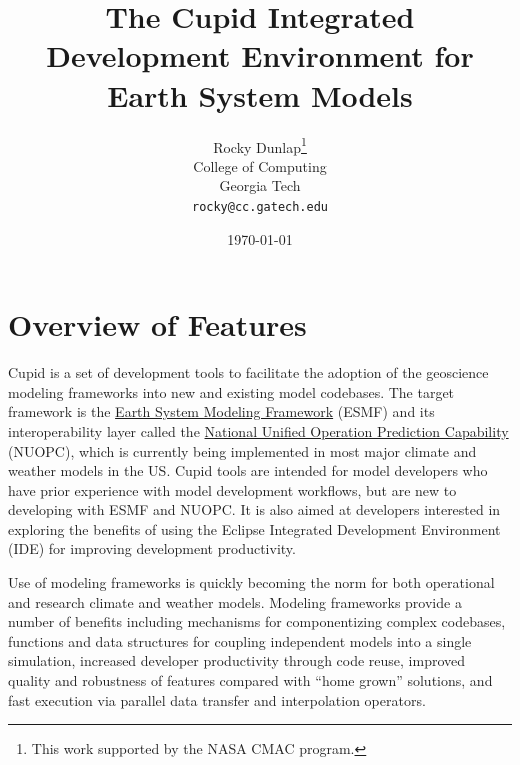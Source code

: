 \documentclass[oneside,11pt]{memoir}
\begin{document}
\title{The Cupid Integrated Development Environment for Earth System Models}
\author{Rocky Dunlap\thanks{This work supported by the NASA CMAC program.}\\
	College of Computing\\
	Georgia Tech\\
	\texttt{rocky@cc.gatech.edu}}
\date{\today}


\maketitle



\clearpage
\tableofcontents

\chapter{Overview of Features}

Cupid is a set of development tools to facilitate the adoption of the geoscience modeling frameworks into new and existing model codebases.  The target framework is the \href{http://www.earthsystemmodeling.org/}{Earth System Modeling Framework} (ESMF) and its interoperability layer called the \href{https://earthsystemcog.org/projects/nuopc/}{National Unified Operation Prediction Capability} (NUOPC), which is currently being implemented in most major climate and weather models in the US. Cupid tools are intended for model developers who have prior experience with model development workflows, but are new to developing with ESMF and NUOPC.  It is also aimed at developers interested in exploring the benefits of using the Eclipse Integrated Development Environment (IDE) for improving development productivity.

Use of modeling frameworks is quickly becoming the norm for both operational and research climate and weather models. Modeling frameworks provide a number of benefits including mechanisms for componentizing complex codebases, functions and data structures for coupling independent models into a single simulation, increased developer productivity through code reuse, improved quality and robustness of features compared with ``home grown'' solutions, and fast execution via parallel data transfer and interpolation operators. 
\end{document}
